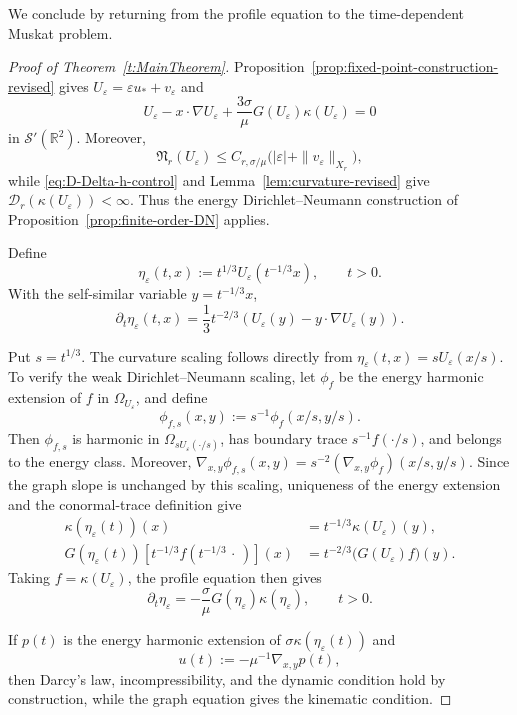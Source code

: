 \documentclass[12pt]{amsart}
\theoremstyle{remark}
\theoremstyle{definition}
\numberwithin{equation}{section}
\newcommand{\R}{\mathbb{R}}
\begin{document}
We conclude by returning from the profile equation to the
time-dependent Muskat problem.
\begin{proof}[Proof of Theorem~\ref{t:MainTheorem}]
Proposition~\ref{prop:fixed-point-construction-revised} gives
\(U_\varepsilon=\varepsilon u_*+v_\varepsilon\) and
\[
 U_\varepsilon - x\cdot\nabla U_\varepsilon + \frac{3\sigma}{\mu}G(U_\varepsilon)\kappa(U_\varepsilon) = 0
\]
in \(\mathcal S'(\R^2)\).  Moreover,
\[
 \mathfrak N_r(U_\varepsilon) \leq C_{r,\sigma/\mu} \bigl( |\varepsilon|+\|v_\varepsilon\|_{X_r} \bigr),
\]
while \eqref{eq:D-Delta-h-control} and Lemma~\ref{lem:curvature-revised}
give \(\mathcal D_r(\kappa(U_\varepsilon))<\infty\).  Thus the energy
Dirichlet--Neumann construction of Proposition~\ref{prop:finite-order-DN}
applies.

Define
\[
 \eta_\varepsilon(t,x) := t^{1/3}U_\varepsilon(t^{-1/3}x), \qquad t>0.
\]
With the self-similar variable \(y=t^{-1/3}x\),
\[
 \partial_t\eta_\varepsilon(t,x) = \frac13t^{-2/3} \left( U_\varepsilon(y) - y\cdot\nabla U_\varepsilon(y) \right).
\]

Put \(s=t^{1/3}\).  The curvature scaling follows directly from
\(\eta_\varepsilon(t,x)=sU_\varepsilon(x/s)\).  To verify the weak
Dirichlet--Neumann scaling, let \(\phi_f\) be the energy harmonic extension
of \(f\) in \(\Omega_{U_\varepsilon}\), and define
\[
 \phi_{f,s}(x,y):=s^{-1}\phi_f(x/s,y/s).
\]
Then \(\phi_{f,s}\) is harmonic in \(\Omega_{sU_\varepsilon(\cdot/s)}\),
has boundary trace \(s^{-1}f(\cdot/s)\), and belongs to the energy class.
Moreover,
\(\nabla_{x,y}\phi_{f,s}(x,y)=s^{-2}(\nabla_{x,y}\phi_f)(x/s,y/s)\).
Since the graph slope is unchanged by this scaling, uniqueness of the
energy extension and the conormal-trace definition give
\[
\begin{aligned}
 \kappa(\eta_\varepsilon(t))(x) &= t^{-1/3}\kappa(U_\varepsilon)(y),\\
 G(\eta_\varepsilon(t)) \left[ t^{-1/3}f(t^{-1/3}\,\cdot\,) \right](x) &= t^{-2/3} \bigl(G(U_\varepsilon)f\bigr)(y).
\end{aligned}
\]
Taking \(f=\kappa(U_\varepsilon)\), the profile equation then gives
\[
 \partial_t\eta_\varepsilon = -\frac{\sigma}{\mu}G(\eta_\varepsilon)\kappa(\eta_\varepsilon), \qquad t>0.
\]

If \(p(t)\) is the energy harmonic extension of
\(\sigma\kappa(\eta_\varepsilon(t))\) and
\[
 u(t):=-\mu^{-1}\nabla_{x,y}p(t),
\]
then Darcy's law, incompressibility, and the dynamic condition hold by
construction, while the graph equation gives the kinematic condition.


\end{proof}
\end{document}
